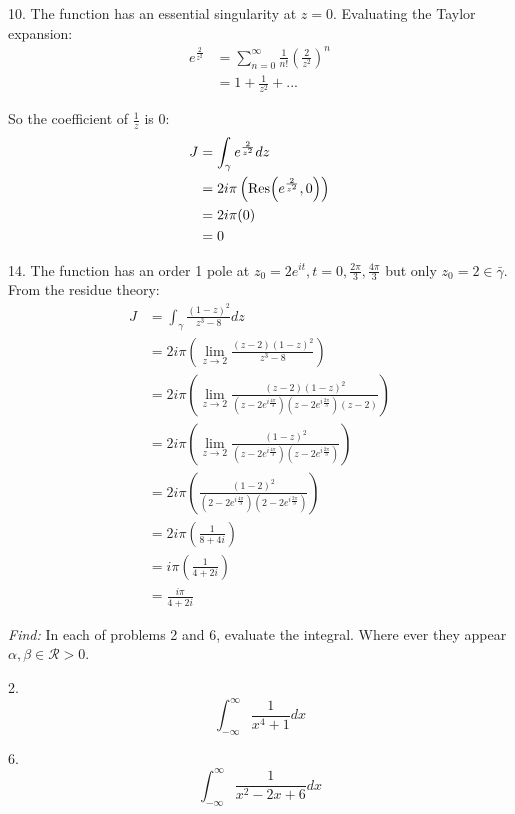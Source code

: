 \documentclass[11pt]{homework}
\begin{document}
10. The function has an essential singularity at $z=0$.
Evaluating the Taylor expansion:
\begin{align*}
e^{\frac{2}{z^2}} &= \sum_{n=0}^{\infty} \frac{1}{n!} \left(\frac{2}{z^2}\right)^n \\
 &= 1 + \frac{1}{z^2} + ...
\end{align*}

So the coefficient of $\frac{1}{z}$ is 0:
\begin{align*}
J &= \int_\gamma e^{\frac{2}{z^2}} dz \\
  &= 2 i \pi \left( \Res(e^\frac{2}{z^2}, 0) \right) \\
  &= 2 i \pi (0) \\
  &= 0
\end{align*}

14. The function has an order 1 pole at $z_0 = 2e^{it}, t = 0,\frac{2\pi}{3}, \frac{4\pi}{3}$
but only $z_0 = 2 \in \bar{\gamma}$.
From the residue theory:
\begin{align*}
J &= \int_\gamma \frac{(1-z)^2}{z^3-8} dz \\
  &= 2i\pi \left( \lim_{z\to 2} \frac{(z-2)(1-z)^2}{z^3-8} \right) \\
  &= 2i\pi \left( \lim_{z\to 2} \frac{(z-2)(1-z)^2}{(z-2e^{i\frac{4\pi}{3}})(z-2e^{i\frac{2\pi}{3}})(z-2)} \right) \\
  &= 2i\pi \left( \lim_{z\to 2} \frac{(1-z)^2}{(z-2e^{i\frac{4\pi}{3}})(z-2e^{i\frac{2\pi}{3}})} \right) \\
  &= 2i\pi \left( \frac{(1-2)^2}{(2-2e^{i\frac{4\pi}{3}})(2-2e^{i\frac{2\pi}{3}})} \right) \\
  &= 2i\pi \left( \frac{1}{8+4i} \right) \\
  &= i\pi \left( \frac{1}{4+2i} \right) \\
  &= \frac{i\pi}{4+2i}
\end{align*}

\emph{Find:}
\newline
In each of problems 2 and 6,
evaluate the integral. 
Where ever they appear $\alpha,\beta\in\mathcal{R}>0$.

2. 
\begin{equation*}
\int_{-\infty}^{\infty} \frac{1}{x^4+1} dx
\end{equation*}

6.
\begin{equation*}
\int_{-\infty}^{\infty} \frac{1}{x^2-2x+6} dx
\end{equation*}
\end{document}
